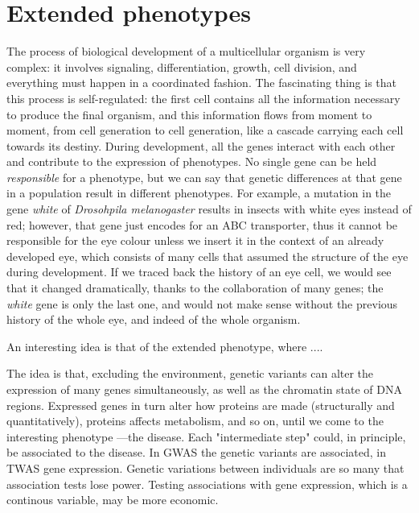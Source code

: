 \documentclass[../main.tex]{subfiles}
\begin{document}
\section{Extended phenotypes}

The process of biological development of a multicellular organism is 
very complex: it involves signaling, differentiation, growth, cell 
division, and everything must happen in a coordinated fashion. The 
fascinating thing is that this process is self-regulated: the first cell 
contains all the information necessary to produce the final organism, 
and this information flows from moment to moment, from cell generation 
to cell generation, like a cascade carrying each cell towards its 
destiny. During development, all the genes interact with each other and 
contribute to the expression of phenotypes. No single gene can be held 
\textit{responsible} for a phenotype, but we can say that genetic 
differences at that gene in a population result in different phenotypes. 
For example, a mutation in the gene \textit{white} of \textit{Drosohpila 
melanogaster} results in insects with white eyes instead of red; 
however, that gene just encodes for an ABC 
transporter\cite{Mackenzie1999}, thus it cannot be responsible for the 
eye colour unless we insert it in the context of an already developed 
eye, which consists of many cells that assumed the structure of the eye 
during development. If we traced back the history of an eye cell, we 
would see that it changed dramatically, thanks to the collaboration of 
many genes; the \textit{white} gene is only the last one, and would not 
make sense without the previous history of the whole eye, and indeed of 
the whole organism.

An interesting idea is that of the extended phenotype\cite{Dawkins1982}, 
where ...\cite{Hunter2009}.

The idea is that, excluding the environment, genetic variants can alter 
the expression of many genes simultaneously, as well as the chromatin 
state of DNA regions. Expressed genes in turn alter how proteins are 
made (structurally and quantitatively), proteins affects metabolism, and 
so on, until we come to the interesting phenotype ---the disease. Each 
"intermediate step" could, in principle, be associated to the disease. 
In GWAS the genetic variants are associated, in TWAS gene expression. 
Genetic variations between individuals are so many that association 
tests lose power. Testing associations with gene expression, which is a 
continous variable, may be more economic.
\end{document}

